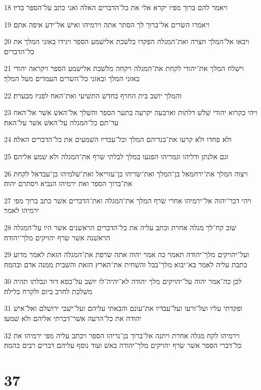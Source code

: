 \par 18 ויאמר להם ברוך מפיו יקרא אלי את כל־הדברים האלה ואני כתב על־הספר בדיו׃
\par 19 ויאמרו השׂרים אל־ברוך לך הסתר אתה וירמיהו ואישׁ אל־ידע איפה אתם׃
\par 20 ויבאו אל־המלך חצרה ואת־המגלה הפקדו בלשׁכת אלישׁמע הספר ויגידו באזני המלך את כל־הדברים׃
\par 21 וישׁלח המלך את־יהודי לקחת את־המגלה ויקחה מלשׁכת אלישׁמע הספר ויקראה יהודי באזני המלך ובאזני כל־השׂרים העמדים מעל המלך׃
\par 22 והמלך יושׁב בית החרף בחדשׁ התשׁיעי ואת־האח לפניו מבערת׃
\par 23 ויהי כקרוא יהודי שׁלשׁ דלתות וארבעה יקרעה בתער הספר והשׁלך אל־האשׁ אשׁר אל־האח עד־תם כל־המגלה על־האשׁ אשׁר על־האח׃
\par 24 ולא פחדו ולא קרעו את־בגדיהם המלך וכל־עבדיו השׁמעים את כל־הדברים האלה׃
\par 25 וגם אלנתן ודליהו וגמריהו הפגעו במלך לבלתי שׂרף את־המגלה ולא שׁמע אליהם׃
\par 26 ויצוה המלך את־ירחמאל בן־המלך ואת־שׂריהו בן־עזריאל ואת־שׁלמיהו בן־עבדאל לקחת את־ברוך הספר ואת ירמיהו הנביא ויסתרם יהוה׃
\par 27 ויהי דבר־יהוה אל־ירמיהו אחרי שׂרף המלך את־המגלה ואת־הדברים אשׁר כתב ברוך מפי ירמיהו לאמר׃
\par 28 שׁוב קח־לך מגלה אחרת וכתב עליה את כל־הדברים הראשׁנים אשׁר היו על־המגלה הראשׁנה אשׁר שׂרף יהויקים מלך־יהודה׃
\par 29 ועל־יהויקים מלך־יהודה תאמר כה אמר יהוה אתה שׂרפת את־המגלה הזאת לאמר מדוע כתבת עליה לאמר בא־יבוא מלך־בבל והשׁחית את־הארץ הזאת והשׁבית ממנה אדם ובהמה׃
\par 30 לכן כה־אמר יהוה על־יהויקים מלך יהודה לא־יהיה־לו יושׁב על־כסא דוד ונבלתו תהיה משׁלכת לחרב ביום ולקרח בלילה׃
\par 31 ופקדתי עליו ועל־זרעו ועל־עבדיו את־עונם והבאתי עליהם ועל־ישׁבי ירושׁלם ואל־אישׁ יהודה את כל־הרעה אשׁר־דברתי אליהם ולא שׁמעו׃
\par 32 וירמיהו לקח מגלה אחרת ויתנה אל־ברוך בן־נריהו הספר ויכתב עליה מפי ירמיהו את כל־דברי הספר אשׁר שׂרף יהויקים מלך־יהודה באשׁ ועוד נוסף עליהם דברים רבים כהמה׃

\chapter{37}

